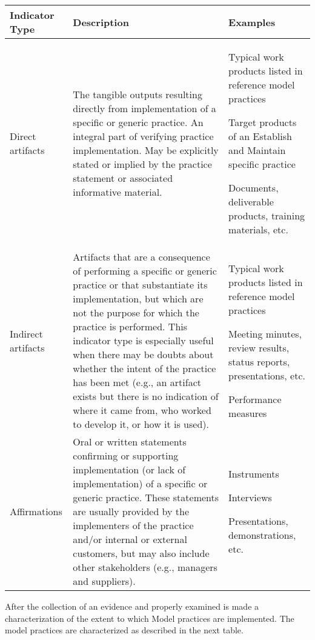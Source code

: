 \begin{tabular}{|p{2cm}|p{7cm}|p{4cm}|}
	\hline Indicator Type & Description & Examples\\
	\hline Direct artifacts & The tangible outputs resulting directly 
	from implementation of a specific or 
	generic practice. An integral part of 
	verifying practice implementation. May 
	be explicitly stated or implied by the 
	practice statement or associated 
	informative material. & Typical work products listed 
	in reference model practices 
	
	Target products of an 
	Establish and Maintain specific practice 
	
	Documents, deliverable 
	products, training materials, 
	etc. \\ 
	\hline Indirect artifacts & Artifacts that are a consequence of 
	performing a specific or generic practice 
	or that substantiate its implementation, 
	but which are not the purpose for which 
	the practice is performed. This indicator 
	type is especially useful when there may 
	be doubts about whether the intent of the 
	practice has been met (e.g., an artifact 
	exists but there is no indication of where 
	it came from, who worked to develop it, 
	or how it is used).  & Typical work products listed 
	in reference model practices 
	
	Meeting minutes, review 
	results, status reports, 
	presentations, etc. 
	
	Performance measures \\ 
	\hline Affirmations & Oral or written statements confirming or 
	supporting implementation (or lack of 
	implementation) of a specific or generic 
	practice. These statements are usually 
	provided by the implementers of the 
	practice and/or internal or external 
	customers, but may also include other 
	stakeholders (e.g., managers and 
	suppliers). &  Instruments 
	
	Interviews 
	
	Presentations, 
	demonstrations, etc.\\ 
	\hline 
\end{tabular} 
\newpage
After the collection of an evidence and properly examined is made a characterization of the extent to which Model practices are implemented. The model practices are characterized as described in the next table.
\newline

